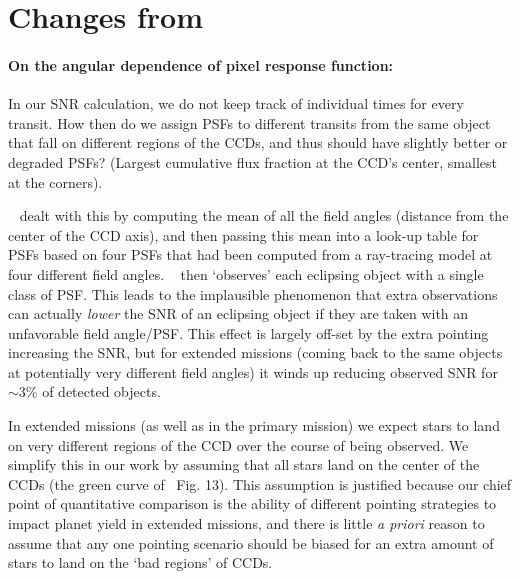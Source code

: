 \section{Changes from~\citet{Sullivan_2015}}
\label{sec:changes_from_S15}
\paragraph{On the angular dependence of \tesss pixel response function:} 
In our SNR calculation, we do not keep track of individual times for every transit. 
How then do we assign PSFs to different transits from the same object that fall on different regions of the CCDs, and thus should have slightly better or degraded PSFs? (Largest cumulative flux fraction at the CCD's center, smallest at the corners). 

~ dealt with this by computing the mean of all the field angles (distance from the center of the CCD axis), and then passing this mean into a look-up table for PSFs based on four PSFs that had been computed from a ray-tracing model at four different field angles.
~ then `observes' each eclipsing object with a single class of PSF.
This leads to the implausible phenomenon that extra observations can actually \textit{lower} the SNR of an eclipsing object if they are taken with an unfavorable field angle/PSF. 
This effect is largely off-set by the extra pointing increasing the SNR, but for extended missions (coming back to the same objects at potentially very different field angles) it winds up reducing observed SNR for $\sim$3\% of detected objects.

In extended missions (as well as in the primary mission) we expect stars to land on very different regions of the CCD over the course of being observed.
We simplify this in our work by assuming that all stars land on the center of the \tess CCDs (the green curve of~ Fig. 13). 
This assumption is justified because our chief point of quantitative comparison is the ability of different pointing strategies to impact \tesss planet yield in extended missions, and there is little \textit{a priori} reason to assume that any one pointing scenario should be biased for an extra amount of stars to land on the `bad regions' of \tesss CCDs.
	
